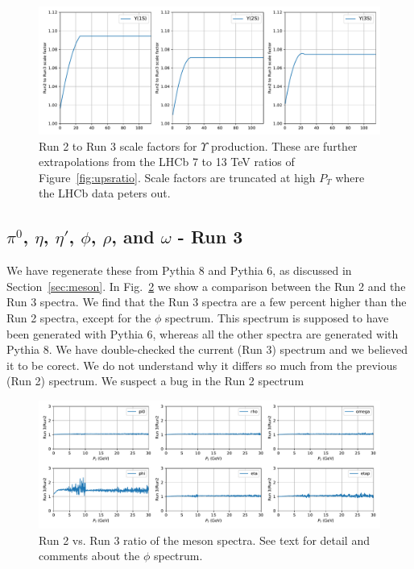 \documentclass[12pt]{article}
\begin{document}
\begin{figure}[H]
  \begin{center}
    \includegraphics[width=0.95\linewidth]{../oniaDirect/upsilon/Run2_to_Run3_scale.pdf}
    \caption{\protect Run 2 to Run 3 scale factors for $\Upsilon$ production.  These
      are further extrapolations from the LHCb 7 to 13 TeV ratios
      of Figure~\ref{fig:upsratio}.  Scale factors are truncated at high $P_T$
      where the LHCb data peters out.}
\label{fig:ups_run_2_run_3_sf}
\end{center}
\end{figure}

\clearpage
\subsection{$\pi^0$, $\eta$, $\eta'$, $\phi$, $\rho$, and $\omega$ -
  Run 3}
\label{sec:mesons3}
We have regenerate these from Pythia 8 and Pythia 6, as discussed in
Section~\ref{sec:meson}.  In Fig.~\ref{fig:meson_run_comparison} we
show a comparison between the Run 2 and the Run 3 spectra.
We find that the Run 3 spectra are a few percent higher than the Run 2
spectra, except for the $\phi$ spectrum.  This spectrum is supposed
to have been generated with Pythia 6, whereas all the other spectra
are generated with Pythia 8.  We have double-checked the current (Run
3)
spectrum and we believed it to be corect.  We do not understand why
it differs so much from the previous (Run 2) spectrum.  We suspect a
bug
in the Run 2 spectrum

\begin{figure}[H]
  \begin{center}
    \includegraphics[width=\linewidth]{../mesonPt/mesons_run3_vs_run2.pdf}
    \caption{\protect Run 2 vs. Run 3 ratio of the meson
      spectra. See text for detail and comments about the $\phi$ spectrum.}
\label{fig:meson_run_comparison}
\end{center}
\end{figure}
\end{document}
